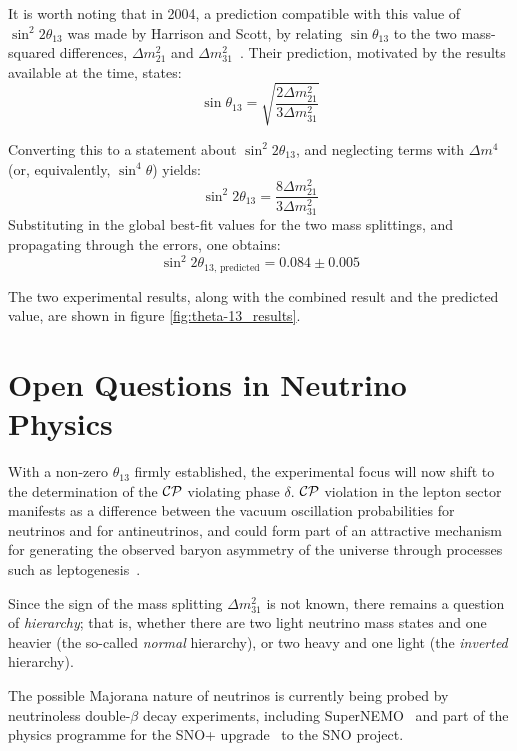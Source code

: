 It is worth noting that in 2004, a prediction compatible with this value of $\sin^2 2\theta_{13}$ was made by Harrison and Scott, by relating $\sin\theta_{13}$ to the two mass-squared differences, $\Delta m^2_{21}$ and $\Delta m^2_{31}$~\citep{Harrison2004}. Their prediction, motivated by the results available at the time, states:
\begin{equation}\label{eqn:theta_13_prediction}
\sin \theta_{13} = \sqrt{\frac{2\Delta m^2_{21}}{3\Delta m^2_{31}}}
\end{equation}

Converting this to a statement about $\sin^2 2\theta_{13}$, and neglecting terms with $\Delta m^4$ (or, equivalently, $\sin^4 \theta$) yields:
\begin{equation}\label{eqn:sin2_2theta_13_prediction}
\sin^2 2\theta_{13} = \frac{8 \Delta m^2_{21}}{3 \Delta m^2_{31}}
\end{equation}
Substituting in the global best-fit values for the two mass splittings, and propagating through the errors, one obtains:
\begin{equation}\label{eqn:prediction_sin2_2theta_13}
\sin^2 2\theta_{13,\,\mathrm{predicted}} = 0.084 \pm 0.005
\end{equation}

The two experimental results, along with the combined result and the predicted value, are shown in figure \ref{fig:theta-13_results}.

\section{Open Questions in Neutrino Physics}
With a non-zero $\theta_{13}$ firmly established, the experimental focus will now shift to the determination of the $\mathcal{C}\mathcal{P}$ violating phase $\delta$. $\mathcal{C}\mathcal{P}$ violation in the lepton sector manifests as a difference between the vacuum oscillation probabilities for neutrinos and for antineutrinos, and could form part of an attractive mechanism for generating the observed baryon asymmetry of the universe through processes such as leptogenesis~\citep{Riotto1999}.

Since the sign of the mass splitting $\Delta m^2_{31}$ is not known, there remains a question of \emph{hierarchy}; that is, whether there are two light neutrino mass states and one heavier (the so-called \emph{normal} hierarchy), or two heavy and one light (the \emph{inverted} hierarchy). 

The possible Majorana nature of neutrinos is currently being probed by neutrinoless double-$\beta$ decay experiments, including SuperNEMO~\citep{SuperNEMO} and part of the physics programme for the SNO+ upgrade~\citep{SNO+} to the SNO project.
